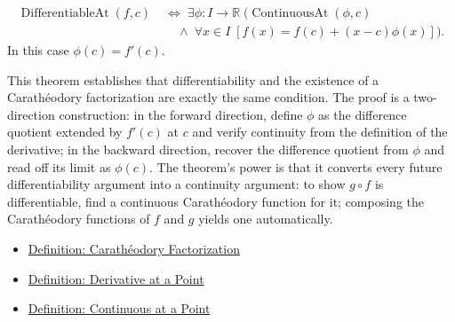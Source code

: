 \begin{remark*}
\begin{align*}
\operatorname{DifferentiableAt}(f,c)
\;&\iff\;
\exists\phi:I\to\mathbb{R}\;
\bigl(\operatorname{ContinuousAt}(\phi,c)\\
&\quad\land\;\forall x \in I\;[f(x)=f(c)+(x-c)\phi(x)]\bigr).
\end{align*}
In this case $\phi(c) = f'(c)$.
\end{remark*}

\begin{remark*}[Interpretation]
This theorem establishes that differentiability and the existence of a Carath\'{e}odory factorization are exactly the same condition. The proof is a two-direction construction: in the forward direction, define $\phi$ as the difference quotient extended by $f'(c)$ at $c$ and verify continuity from the definition of the derivative; in the backward direction, recover the difference quotient from $\phi$ and read off its limit as $\phi(c)$. The theorem's power is that it converts every future differentiability argument into a continuity argument: to show $g \circ f$ is differentiable, find a continuous Carath\'{e}odory function for it; composing the Carath\'{e}odory functions of $f$ and $g$ yields one automatically.
\end{remark*}

\begin{dependencies}
\begin{itemize}
  \item \hyperref[def:caratheodory-factorization]{Definition: Carath\'{e}odory Factorization}
  \item \hyperref[def:derivative-at-a-point]{Definition: Derivative at a Point}
  \item \hyperref[def:continuous-at-point]{Definition: Continuous at a Point}
\end{itemize}
\end{dependencies}

